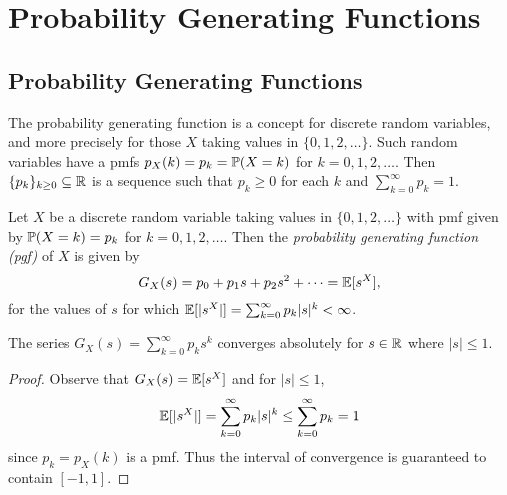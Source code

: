 \chapter{Probability Generating Functions}

\section{Probability Generating Functions}

The probability generating function is a concept
for discrete random variables, and more precisely
for those $X$ taking values in
$\{0, 1, 2, \dots\}$. Such
random variables have a pmfs $p_X(k) = p_k = \mathbb{P}(X = k)$
for $k = 0, 1, 2, \dots$. Then
$\{p_k\}_{k \ge 0} \subseteq \mathbb{R}$ is a sequence
such that $p_k \ge 0$ for
each $k$ and $\sum_{k = 0}^\infty p_k = 1$.

\begin{definition}
  Let $X$ be a discrete random variable taking
  values in $\{0, 1, 2, \dots\}$ with pmf given
  by $\mathbb{P}(X = k) = p_k$ for $k = 0, 1, 2, \dots$.
  Then the \emph{probability generating function (pgf)}
  of $X$ is given by
  \[
    G_X(s) = p_0 + p_1s + p_2s^2 + \dots
    = \mathbb{E}[s^X],
  \]
  for the values of $s$ for which
  $\mathbb{E}[|s^X|] = \sum_{k = 0}^\infty p_k |s|^k < \infty$.
\end{definition}

\begin{prop}
  The series $G_X(s) = \sum_{k = 0}^\infty p_k s^k$ converges
  absolutely for $s \in \mathbb{R}$ where $|s| \le 1$.
\end{prop}

\begin{proof}
  Observe that $G_X(s) = \mathbb{E}[s^X]$
  and for $|s| \le 1$,
  \[
    \mathbb{E}[|s^X|]
    = \sum_{k = 0}^\infty p_k |s|^k
    \le \sum_{k = 0}^\infty p_k
    = 1
  \]
  since $p_k = p_X(k)$ is a pmf. Thus the
  interval of convergence is guaranteed to contain
  $[-1, 1]$.
\end{proof}

